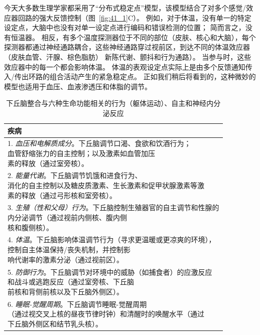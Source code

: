 今天大多数生理学家都采用了“分布式稳定点”模型，该模型结合了对多个感觉/效应器回路的强大反馈控制（图~\ref{fig:41_1}C）。
例如，对于体温，没有单一的特定设定点，大脑中也没有对单一设定点进行编码和错误检测的位置；
简而言之，没有恒温器。
相反，有多个温度探测器位于不同的部位（皮肤、核心和大脑），每个探测器都通过神经通路耦合，这些神经通路穿过视前区，到达不同的体温效应器（皮肤血管、汗腺、棕色脂肪） 新陈代谢、颤抖和行为通路）。
当参与时，这些效应器中的每一个都会影响体温。
体温的表观设定点实际上是由多个反馈通知传入/传出环路的组合活动产生的紧急稳定点。
正如我们稍后将看到的，这种微妙的模型也适用于血压、血液渗透压和体脂的调节。


\begin{table}[htbp]
	\caption{下丘脑整合与六种生命功能相关的行为（躯体运动）、自主和神经内分泌反应} \label{tab:41_1} \centering
	\begin{tabular}{l}
		\toprule
		疾病 \\
		\midrule
		\makecell[l]{1. \textit{血压和电解质成分}。下丘脑调节口渴、食欲和饮酒行为；\\血管舒缩张力的自主控制；以及激素如血管加压\\素的释放（通过室旁核）。}  \\
		\makecell[l]{2. \textit{能量代谢}。下丘脑调节饥饿和进食行为、\\消化的自主控制以及糖皮质激素、生长激素和促甲状腺激素等激\\素的释放（通过弓形核和室旁核）。}  \\
		\makecell[l]{3. \textit{生殖（性和父母）行为}。下丘脑控制生殖器官的自主调节和性腺的\\内分泌调节（通过视前内侧核、腹内侧\\核和腹侧核）。}  \\
		\makecell[l]{4. \textit{体温}。下丘脑影响体温调节行为（寻求更温暖或更凉爽的环境），\\控制自主体温保持/丧失机制，并控制影\\响代谢率的激素分泌（通过视前区）。}  \\
		\makecell[l]{5. \textit{防御行为}。下丘脑调节对环境中的威胁（如捕食者）的应激反应\\和战斗或逃跑反应（通过室旁核、下丘脑\\前核和背侧前核以及下丘脑外侧区）。}  \\
		\makecell[l]{6. \textit{睡眠-觉醒周期}。下丘脑调节睡眠-觉醒周期\\（通过视交叉上核的昼夜节律时钟）和清醒时的唤醒水平（通过\\下丘脑外侧区和结节乳头核）。}  \\
		\bottomrule
	\end{tabular}
\end{table}

